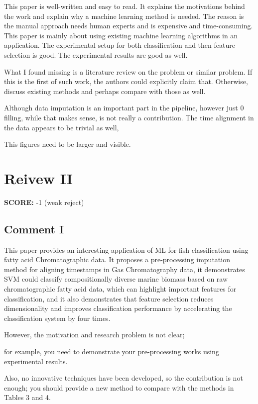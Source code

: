 \documentclass[runningheads]{llncs}
\begin{document}
This paper is well-written and easy to read. It explains the motivations behind the work and explain why a machine learning method is needed. The reason is the manual approach needs human experts and is expensive and time-consuming. This paper is mainly about using existing machine learning algorithms in an application. The experimental setup for both classification and then feature selection is good. The experimental results are good as well.

What I found missing is a literature review on the problem or similar problem. If this is the first of such work, the authors could explicitly claim that. Otherwise, discuss existing methods and perhaps compare with those as well.

Although data imputation is an important part in the pipeline, however just 0 filling, while that makes sense, is not really a contribution. The time alignment in the data appears to be trivial as well,

This figures need to be larger and visible.

\section{Reivew II}

\textbf{SCORE:} -1 (weak reject)

\subsection{Comment I}

This paper provides an interesting application of ML for fish classification using fatty acid Chromatographic data. It proposes a pre-processing imputation method for aligning timestamps in Gas Chromatography data, it demonstrates SVM could classify compositionally diverse marine biomass based on raw chromatographic fatty acid data, which can highlight important features for classification, and it also demonstrates that feature selection reduces dimensionality and improves classification performance by accelerating the classification system by four times. 

However, the motivation and research problem is not clear; 

for example, you need to demonstrate your pre-processing works using experimental results. 

Also, no innovative techniques have been developed, so the contribution is not enough; you should provide a new method to compare with the methods in Tables 3 and 4.
\end{document}
